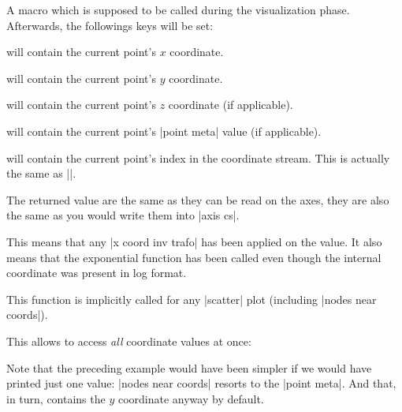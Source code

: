 \begin{command}{\pgfplotspointgetcoordinates}
    A macro which is supposed to be called during the visualization phase.
    Afterwards, the followings keys will be set:

     will contain the current point's $x$ coordinate.

     will contain the current point's $y$ coordinate.

     will contain the current point's $z$ coordinate
    (if applicable).

     will contain the current point's
    |point meta| value (if applicable).

     will contain the current point's index in
    the coordinate stream. This is actually the same as |\coordindex|.

    The returned value are the same as they can be read on the axes, they are
    also the same as you would write them into |axis cs|.

    This means that any |x coord inv trafo| has been applied on the value. It
    also means that the exponential function has been called even though the
    internal coordinate was present in log format.

    This function is implicitly called for any |scatter| plot (including
    |nodes near coords|).

    This allows to access \emph{all} coordinate values at once:
\begin{codeexample}[]
\end{codeexample}
    Note that the preceding example would have been simpler if we would have
    printed just one value: |nodes near coords| resorts to the |point meta|.
    And that, in turn, contains the $y$ coordinate anyway by default.


\end{command}
